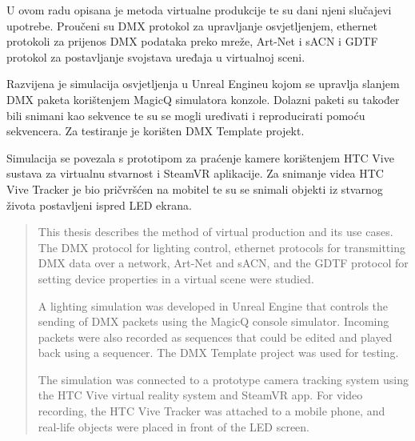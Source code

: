 \documentclass[times, utf8, zavrsni, numeric]{fer}
\begin{document}
\begin{sazetak}
U ovom radu opisana je metoda virtualne produkcije te su dani njeni slučajevi upotrebe. Proučeni su DMX protokol za upravljanje osvjetljenjem, ethernet protokoli za prijenos DMX podataka preko mreže, Art-Net i sACN i GDTF protokol za postavljanje svojstava uređaja u virtualnoj sceni. \newline

Razvijena je simulacija osvjetljenja u Unreal Engineu kojom se upravlja slanjem DMX paketa korištenjem MagicQ simulatora konzole. Dolazni paketi su također bili snimani kao sekvence te su se mogli uređivati i reproducirati pomoću sekvencera. Za testiranje je korišten DMX Template projekt. \newline

Simulacija se povezala s prototipom za praćenje kamere korištenjem HTC Vive sustava za virtualnu stvarnost i SteamVR aplikacije. Za snimanje videa HTC Vive Tracker je bio pričvršćen na mobitel te su se snimali objekti iz stvarnog života postavljeni ispred LED ekrana.

\end{sazetak}

\pagebreak

\begin{abstract}
This thesis describes the method of virtual production and its use cases. The DMX protocol for lighting control, ethernet protocols for transmitting DMX data over a network, Art-Net and sACN, and the GDTF protocol for setting device properties in a virtual scene were studied. \newline

A lighting simulation was developed in Unreal Engine that controls the sending of DMX packets using the MagicQ console simulator. Incoming packets were also recorded as sequences that could be edited and played back using a sequencer. The DMX Template project was used for testing. \newline

The simulation was connected to a prototype camera tracking system using the HTC Vive virtual reality system and SteamVR app. For video recording, the HTC Vive Tracker was attached to a mobile phone, and real-life objects were placed in front of the LED screen.

\end{abstract}
\end{document}
